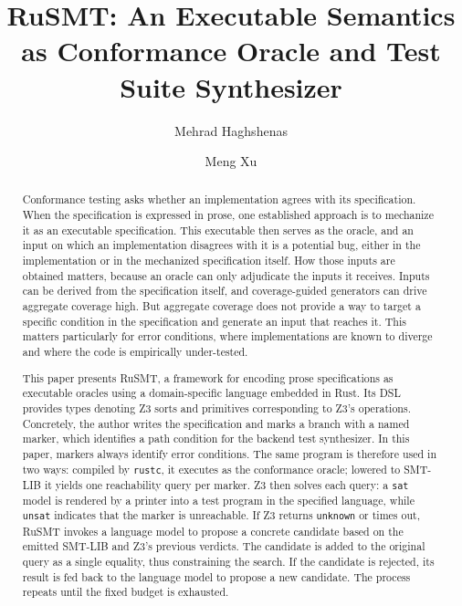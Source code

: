 \documentclass[sigconf,screen]{acmart}
\theoremstyle{definition}
\theoremstyle{remark}
\newcommand{\rusmt}{RuSMT}
\newcommand{\code}[1]{\texttt{#1}}
\begin{document}
\title{\rusmt{}: An Executable Semantics as Conformance Oracle and Test Suite Synthesizer}

\author{Mehrad Haghshenas}
\correspondingauthor
{}

\author{Meng Xu}

\begin{abstract}
Conformance testing asks whether an implementation agrees with its specification. When the specification is expressed in prose, one established approach is to mechanize it as an executable specification. This executable then serves as the oracle, and an input on which an implementation disagrees with it is a potential bug, either in the implementation or in the mechanized specification itself. How those inputs are obtained matters, because an oracle can only adjudicate the inputs it receives. Inputs can be derived from the specification itself, and coverage-guided generators can drive aggregate coverage high. But aggregate coverage does not provide a way to target a specific condition in the specification and generate an input that reaches it. This matters particularly for error conditions, where implementations are known to diverge and where the code is empirically under-tested.

This paper presents \rusmt{}, a framework for encoding prose specifications as executable oracles using a domain-specific language embedded in Rust. Its DSL provides types denoting Z3 sorts and primitives corresponding to Z3's operations. Concretely, the author writes the specification and marks a branch with a named marker, which identifies a path condition for the backend test synthesizer. In this paper, markers always identify error conditions. The same program is therefore used in two ways: compiled by \code{rustc}, it executes as the conformance oracle; lowered to SMT-LIB it yields one reachability query per marker. Z3 then solves each query: a \code{sat} model is rendered by a printer into a test program in the specified language, while \code{unsat} indicates that the marker is unreachable. If Z3 returns \code{unknown} or times out, \rusmt{} invokes a language model to propose a concrete candidate based on the emitted SMT-LIB and Z3's previous verdicts. The candidate is added to the original query as a single equality, thus constraining the search. If the candidate is rejected, its result is fed back to the language model to propose a new candidate. The process repeats until the fixed budget is exhausted.


\end{abstract}
\end{document}
